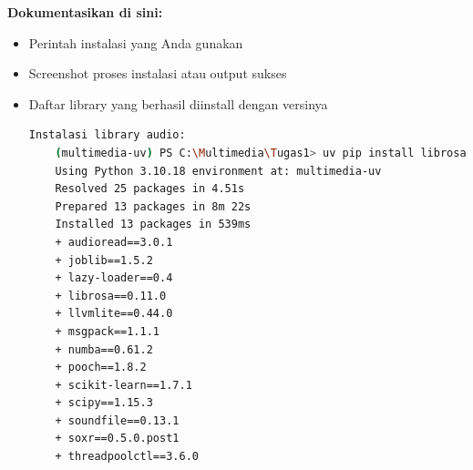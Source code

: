 \documentclass[11pt,a4paper]{article}
\begin{document}
\textbf{Dokumentasikan di sini:}
\begin{itemize}
    \item Perintah instalasi yang Anda gunakan
    \item Screenshot proses instalasi atau output sukses
    \item Daftar library yang berhasil diinstall dengan versinya
    \begin{lstlisting}[language=bash, caption=Instalasi library umum]
Instalasi library audio:
    (multimedia-uv) PS C:\Multimedia\Tugas1> uv pip install librosa soundfile scipy
    Using Python 3.10.18 environment at: multimedia-uv
    Resolved 25 packages in 4.51s
    Prepared 13 packages in 8m 22s
    Installed 13 packages in 539ms
    + audioread==3.0.1                                                                                                                                              
    + joblib==1.5.2                                                                                                                                                 
    + lazy-loader==0.4                                                                                                                                              
    + librosa==0.11.0                                                                                                                                               
    + llvmlite==0.44.0                                                                                                                                              
    + msgpack==1.1.1                                                                                                                                                
    + numba==0.61.2                                                                                                                                                 
    + pooch==1.8.2                                                                                                                                                  
    + scikit-learn==1.7.1                                                                                                                                           
    + scipy==1.15.3                                                                                                                                                 
    + soundfile==0.13.1                                                                                                                                             
    + soxr==0.5.0.post1                                                                                                                                             
    + threadpoolctl==3.6.0


\end{lstlisting}
\end{itemize}
\end{document}
